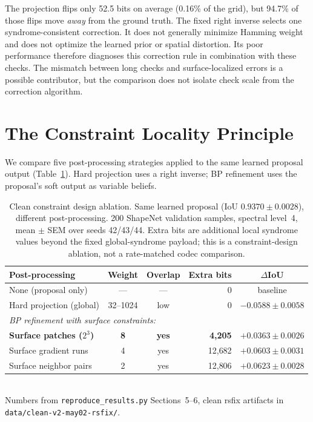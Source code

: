 \documentclass[11pt,a4paper]{article}
\begin{document}
The projection flips only 52.5 bits on average (0.16\% of the grid), but
94.7\% of those flips move \emph{away} from the ground truth. The fixed right
inverse selects one syndrome-consistent correction. It does not generally
minimize Hamming weight and does not optimize the learned prior or spatial
distortion. Its poor performance therefore diagnoses this correction rule
in combination with these checks. The mismatch between long checks and
surface-localized errors is a possible contributor, but the comparison
does not isolate check scale from the correction algorithm.

\section{The Constraint Locality Principle}
\label{sec:locality}

We compare five post-processing strategies applied to the same learned
proposal output (Table~\ref{tab:locality}). Hard projection uses a right
inverse; BP refinement uses the proposal's soft output as variable
beliefs.

\begin{table}[htbp]
\centering
\caption{Clean constraint design ablation. Same learned proposal
(IoU $0.9370\pm0.0028$), different post-processing. 200 ShapeNet validation
samples, spectral level~4, mean $\pm$ SEM over seeds 42/43/44. Extra bits are
additional local syndrome values beyond the fixed global-syndrome payload; this is a
constraint-design ablation, not a rate-matched codec comparison.}
\label{tab:locality}
\begin{tabular}{lccrc}
\toprule
Post-processing & Weight & Overlap & Extra bits & $\Delta$IoU \\
\midrule
None (proposal only) & --- & --- & 0 & baseline \\
Hard projection (global) & 32--1024 & low & 0 & $-0.0588 \pm 0.0058$ \\
\midrule
\multicolumn{5}{l}{\emph{BP refinement with surface constraints:}} \\
\textbf{Surface patches ($2^3$)} & \textbf{8} & \textbf{yes} & \textbf{4{,}205} & $\bm{+0.0363 \pm 0.0026}$ \\
Surface gradient runs & 4 & yes & 12{,}682 & $+0.0603 \pm 0.0031$ \\
Surface neighbor pairs & 2 & yes & 12{,}806 & $+0.0623 \pm 0.0028$ \\
\bottomrule
\end{tabular}
\\[4pt]
\footnotesize{Numbers from \texttt{reproduce\_results.py} Sections~5--6,
clean rsfix artifacts in \texttt{data/clean-v2-may02-rsfix/}.}
\end{table}
\end{document}
